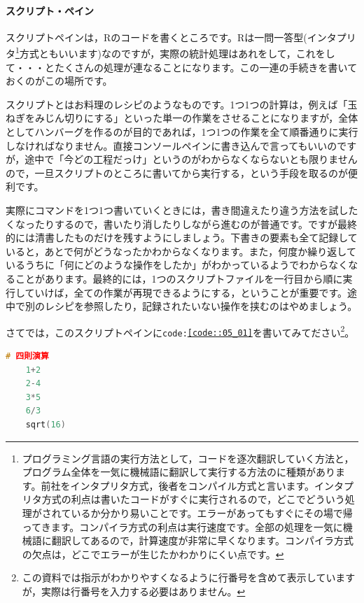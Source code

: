 \documentclass{ltjbook}
\begin{document}
\paragraph{スクリプト・ペイン}
スクリプトペインは，Rのコードを書くところです。Rは一問一答型(インタプリタ\footnote{プログラミング言語の実行方法として，コードを逐次翻訳していく方法と，プログラム全体を一気に機械語に翻訳して実行する方法のに種類があります。前社をインタプリタ方式，後者をコンパイル方式と言います。インタプリタ方式の利点は書いたコードがすぐに実行されるので，どこでどういう処理がされているか分かり易いことです。エラーがあってもすぐにその場で帰ってきます。コンパイラ方式の利点は実行速度です。全部の処理を一気に機械語に翻訳してあるので，計算速度が非常に早くなります。コンパイラ方式の欠点は，どこでエラーが生じたかわかりにくい点です。}方式ともいいます)なのですが，実際の統計処理はあれをして，これをして・・・とたくさんの処理が連なることになります。この一連の手続きを書いておくのがこの場所です。

スクリプトとはお料理のレシピのようなものです。1つ1つの計算は，例えば「玉ねぎをみじん切りにする」といった単一の作業をさせることになりますが，全体としてハンバーグを作るのが目的であれば，1つ1つの作業を全て順番通りに実行しなければなりません。直接コンソールペインに書き込んで言ってもいいのですが，途中で「今どの工程だっけ」というのがわからなくならないとも限りませんので，一旦スクリプトのところに書いてから実行する，という手段を取るのが便利です。

実際にコマンドを1つ1つ書いていくときには，書き間違えたり違う方法を試したくなったりするので，書いたり消したりしながら進むのが普通です。ですが最終的には清書したものだけを残すようにしましょう。下書きの要素も全て記録していると，あとで何がどうなったかわからなくなります。また，何度か繰り返しているうちに「何にどのような操作をしたか」がわかっているようでわからなくなることがあります。最終的には，1つのスクリプトファイルを一行目から順に実行していけば，全ての作業が再現できるようにする，ということが重要です。途中で別のレシピを参照したり，記録されたいない操作を挟むのはやめましょう。

さてでは，このスクリプトペインに\texttt{code:\ref{code::05_01}}を書いてみてださい\footnote{この資料では指示がわかりやすくなるように行番号を含めて表示していますが，実際は行番号を入力する必要はありません。}。

\begin{lstlisting}[language=c++,label={code::05_01},caption={四則演算のコード}]
	# 四則演算
	1+2
	2-4
	3*5
	6/3
	sqrt(16)
\end{lstlisting}
\end{document}
